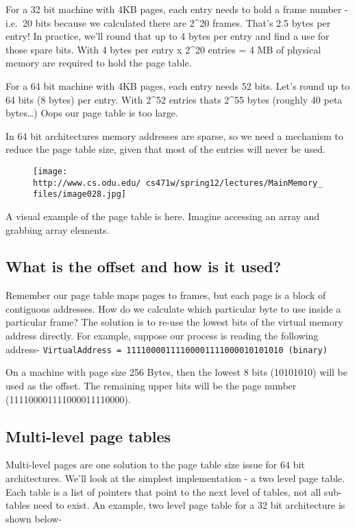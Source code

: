 For a 32 bit machine with 4KB pages, each entry needs to hold a frame
number - i.e.~20 bits because we calculated there are 2\^{}20 frames.
That's 2.5 bytes per entry! In practice, we'll round that up to 4 bytes
per entry and find a use for those spare bits. With 4 bytes per entry x
2\^{}20 entries = 4 MB of physical memory are required to hold the page
table.

For a 64 bit machine with 4KB pages, each entry needs 52 bits. Let's
round up to 64 bits (8 bytes) per entry. With 2\^{}52 entries thats
2\^{}55 bytes (roughly 40 peta bytes\ldots{}) Oops our page table is too
large.

In 64 bit architectures memory addresses are sparse, so we need a
mechanism to reduce the page table size, given that most of the entries
will never be used.

\begin{figure}[htbp]
\centering
\texttt{[image: http://www.cs.odu.edu/~cs471w/spring12/lectures/MainMemory\_files/image028.jpg]}
\caption{}
\end{figure}

A visual example of the page table is here. Imagine accessing an array
and grabbing array elements.

\subsection{What is the offset and how is it
used?}\label{what-is-the-offset-and-how-is-it-used}

Remember our page table maps pages to frames, but each page is a block
of contiguous addresses. How do we calculate which particular byte to
use inside a particular frame? The solution is to re-use the lowest bits
of the virtual memory address directly. For example, suppose our process
is reading the following address-
\texttt{VirtualAddress\ =\ 11110000111100001111000010101010\ (binary)}

On a machine with page size 256 Bytes, then the lowest 8 bits (10101010)
will be used as the offset. The remaining upper bits will be the page
number (111100001111000011110000).

\subsection{Multi-level page tables}\label{multi-level-page-tables}

Multi-level pages are one solution to the page table size issue for 64
bit architectures. We'll look at the simplest implementation - a two
level page table. Each table is a list of pointers that point to the
next level of tables, not all sub-tables need to exist. An example, two
level page table for a 32 bit architecture is shown below-

